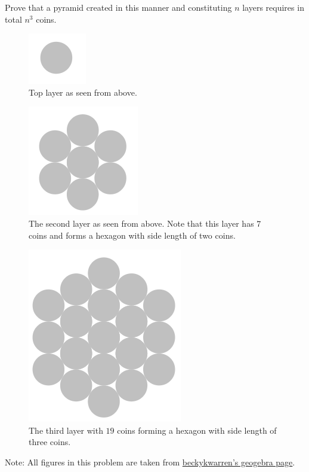 \documentclass[a4paper]{exam}
\begin{document}
\begin{questions}
    Prove that a pyramid created in this manner and constituting $n$ layers requires in total $n^3$ coins.
  \begin{figure}[h!]
    \centerline{\includegraphics[scale = 0.5]{layer1}}
    \caption{Top layer as seen from above.}
    \label{layer1}
  \end{figure}
  \begin{figure}[h!]
    \centerline{\includegraphics[scale = 0.5]{layer2.png}}
    \caption{The second layer as seen from above. Note that this layer has $7$ coins and forms a hexagon with side length of two coins.}
    \label{layer2}
  \end{figure}
  \newpage
  \begin{figure}[h!]
    \centerline{\includegraphics[scale = 0.5]{layer3.png}}
    \caption{The third layer with $19$ coins forming a hexagon with side length of three coins.}
    \label{layer3}
  \end{figure}

  Note: All figures in this problem are taken from \href{https://www.geogebra.org/m/cnqdjcph}{beckykwarren's geogebra page}.


\end{questions}
\end{document}
